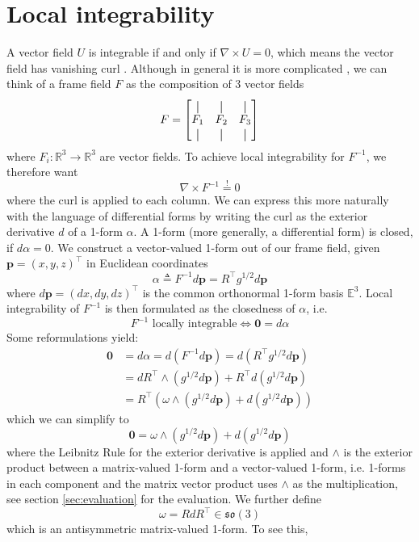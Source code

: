\documentclass[../thesis.tex]{subfiles}
\begin{document}
\section{Local integrability}
A vector field $U$ is integrable if and only if $\nabla \times U = 0$,
which means the vector field has vanishing curl \cite{Pap20}.
Although in general it is more complicated \cite{Nieser}, we can think of a frame field $F$ as the composition of 3 vector fields
$$F = \begin{bmatrix}
  \vertbar & \vertbar & \vertbar \\
  F_1 & F_2 & F_3 \\
  \vertbar & \vertbar & \vertbar
\end{bmatrix}$$
where $F_i : \mathbb{R}^3 \to \mathbb{R}^3$ are vector fields.
To achieve local integrability for $F^{-1}$, we therefore want
$$\nabla \times F^{-1} \overset{!}{=}0$$
where the curl is applied to each column.
We can express this more naturally with the language of differential forms by writing
the curl as the exterior derivative $d$ of a 1-form $\alpha$.
A 1-form (more generally, a differential form) is closed, if $d\alpha = 0$.
We construct a vector-valued 1-form out of our frame field,
given $\bm{p}=(x,y,z)^{\top}$ in Euclidean coordinates
$$\alpha \triangleq F^{-1}d\bm{p} = R^{\top}g^{1/2}d\bm{p}$$
where $d\bm{p} = (dx,dy,dz)^{\top}$ is the common orthonormal 1-form basis $\mathbb{E}^3$.
Local integrability of $F^{-1}$ is then formulated as the closedness of $\alpha$, i.e.
$$F^{-1} \text{ locally integrable} \iff \bm{0} = d\alpha$$
Some reformulations yield:
\begin{align*}
  \bm{0} &= d\alpha = d(F^{-1}d\bm{p}) = d(R^{\top}g^{1/2}d\bm{p})\\
  &= dR^{\top} \wedge  (g^{1/2}d\bm{p}) + R^{\top}d(g^{1/2}d\bm{p}) \\
  &= R^{\top}(\omega \wedge (g^{1/2}d\bm{p})+ d(g^{1/2}d\bm{p}))
\end{align*}
which we can simplify to
\begin{equation}\label{eq:oneform}
  \bm{0} = \omega \wedge (g^{1/2}d\bm{p})+ d(g^{1/2}d\bm{p})
\end{equation}
where the Leibnitz Rule for the exterior derivative is applied
and $\wedge$ is the exterior product between a matrix-valued 1-form and a vector-valued 1-form,
i.e. 1-forms in each component and the matrix vector product uses $\wedge$
as the multiplication, see section \ref{sec:evaluation} for the evaluation.
We further define
$$\omega = RdR^{\top} \in \mathfrak{so}(3)$$
which is an antisymmetric matrix-valued 1-form. To see this, 
\end{document}
